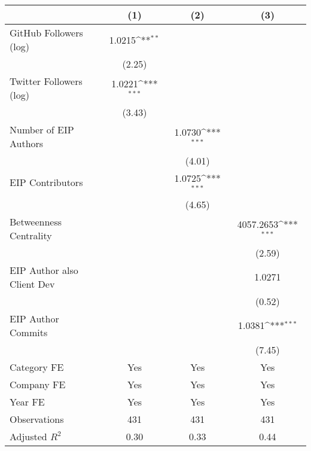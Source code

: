 {
\def\sym#1{\ifmmode^{#1}\else\(^{#1}\)\fi}
\begin{tabular}{l*{3}{c}}
\hline\hline
                                   &\multicolumn{1}{c}{(1)}         &\multicolumn{1}{c}{(2)}         &\multicolumn{1}{c}{(3)}         \\
\hline
GitHub Followers (log)             &      1.0215\sym{**} &                     &                     \\
                                   &      (2.25)         &                     &                     \\
[1em]
Twitter Followers (log)            &      1.0221\sym{***}&                     &                     \\
                                   &      (3.43)         &                     &                     \\
[1em]
Number of EIP Authors              &                     &      1.0730\sym{***}&                     \\
                                   &                     &      (4.01)         &                     \\
[1em]
EIP Contributors                   &                     &      1.0725\sym{***}&                     \\
                                   &                     &      (4.65)         &                     \\
[1em]
Betweenness Centrality             &                     &                     &   4057.2653\sym{***}\\
                                   &                     &                     &      (2.59)         \\
[1em]
EIP Author also Client Dev         &                     &                     &      1.0271         \\
                                   &                     &                     &      (0.52)         \\
[1em]
EIP Author Commits                 &                     &                     &      1.0381\sym{***}\\
                                   &                     &                     &      (7.45)         \\
[1em]
Category FE                        &         Yes         &         Yes         &         Yes         \\
[1em]
Company FE                         &         Yes         &         Yes         &         Yes         \\
[1em]
Year FE                            &         Yes         &         Yes         &         Yes         \\
\hline
Observations                       &         431         &         431         &         431         \\
Adjusted \(R^{2}\)                 &        0.30         &        0.33         &        0.44         \\
\hline\hline
\end{tabular}
}
